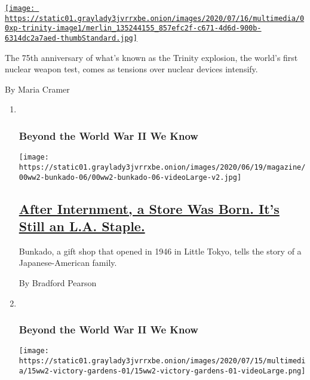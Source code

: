 \begin{enumerate}
  \href{/2020/07/15/us/trinity-test-anniversary.html}{\texttt{[image: https://static01.graylady3jvrrxbe.onion/images/2020/07/16/multimedia/00xp-trinity-image1/merlin\_135244155\_857efc2f-c671-4d6d-900b-6314dc2a7aed-thumbStandard.jpg]}}

  The 75th anniversary of what's known as the Trinity explosion, the
  world's first nuclear weapon test, comes as tensions over nuclear
  devices intensify.

  By Maria Cramer
\end{enumerate}

\begin{enumerate}
\def\labelenumi{\arabic{enumi}.}
\item ~
  \hypertarget{beyond-the-world-war-ii-we-know-3}{%
  \subsubsection{Beyond the World War II We
  Know}\label{beyond-the-world-war-ii-we-know-3}}

  \texttt{[image: https://static01.graylady3jvrrxbe.onion/images/2020/06/19/magazine/00ww2-bunkado-06/00ww2-bunkado-06-videoLarge-v2.jpg]}

  \hypertarget{after-internment-a-store-was-born-its-still-an-la-staple}{%
  \subsection{\texorpdfstring{\href{/2020/07/01/magazine/little-tokyo-bunkado-los-angeles-japanese.html}{After
  Internment, a Store Was Born. It's Still an L.A.
  Staple.}}{After Internment, a Store Was Born. It's Still an L.A. Staple.}}\label{after-internment-a-store-was-born-its-still-an-la-staple}}

  Bunkado, a gift shop that opened in 1946 in Little Tokyo, tells the
  story of a Japanese-American family.

  By Bradford Pearson
\item ~
  \hypertarget{beyond-the-world-war-ii-we-know-4}{%
  \subsubsection{Beyond the World War II We
  Know}\label{beyond-the-world-war-ii-we-know-4}}

  \texttt{[image: https://static01.graylady3jvrrxbe.onion/images/2020/07/15/multimedia/15ww2-victory-gardens-01/15ww2-victory-gardens-01-videoLarge.png]}

  \hypertarget{victory-gardens-were-more-about-solidarity-than-survival}{%
}
\end{enumerate}
